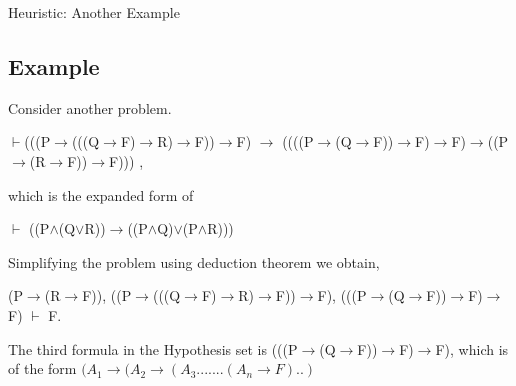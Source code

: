 \documentclass{beamer}
\begin{document}
\begin{frame}{Heuristic: Another Example}


\subsection{Example}
Consider another problem. \newline

\begin{center}
$\vdash$(((P$\rightarrow$(((Q$\rightarrow$F)$\rightarrow$R)$\rightarrow$F))$\rightarrow$F)
$\rightarrow$
\newline
((((P$\rightarrow$(Q$\rightarrow$F))$\rightarrow$F)$\rightarrow$F)$\rightarrow$((P$\rightarrow$(R$\rightarrow$F))$\rightarrow$F)))
, 
\end{center}


which is the expanded form of  
\begin{center}
 $\vdash$ ((P$\wedge$(Q$\vee$R))$\rightarrow$((P$\wedge$Q)$\vee$(P$\wedge$R)))
\end{center}



Simplifying the problem using deduction theorem we obtain,
\begin{center}
(P$\rightarrow$(R$\rightarrow$F)), \newline
((P$\rightarrow$(((Q$\rightarrow$F)$\rightarrow$R)$\rightarrow$F))$\rightarrow$F), \newline
(((P$\rightarrow$(Q$\rightarrow$F))$\rightarrow$F)$\rightarrow$F) $\vdash$ F. \newline
\end{center}


The third formula in the Hypothesis set is (((P$\rightarrow$(Q$\rightarrow$F))$\rightarrow$F)$\rightarrow$F), which is of the form $(A_{1}\rightarrow(A_{2}\rightarrow(A_{3}.......(A_{n}\rightarrow F)..)$ 


\end{frame}
\end{document}
